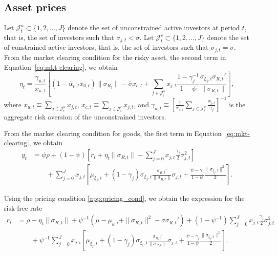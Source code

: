 \subsection{Asset prices}


Let $\mathcal{J}_t^u \subset \{1,2,\ldots, J\}$ denote the set of unconstrained active investors at period $t$, that is, the set of investors such that $\sigma_{j,t} < \overline{\sigma}$. Let $\mathcal{J}_t^c \subset \{1,2,\ldots, J\}$ denote the set of constrained active investors, that is, the set of investors such that $\sigma_{j,t} = \overline{\sigma}$. From the market clearing condition for the risky asset, the second term in Equation~\eqref{eq:mkt-clearing}, we obtain
\begin{equation}
    \eta_{t} =  \frac{\gamma_{u,t}}{x_{u,t}} \left[ (1-\overline{\alpha}_{p,t} x_{0,t})\|\sigma_{R_t}\| - \overline{\sigma} x_{c,t}+ \sum_{j\in \mathcal{J}_t^u} x_{j,t} \frac{1-\gamma_j^{-1}}{1-\psi} \frac{\sigma_{\xi_j,t} \sigma_{R,t}'}{\|\sigma_{R,t}\|}\right],
\end{equation}
where $x_{u,t} \equiv \sum_{j\in \mathcal{J}_t^u} x_{j,t}$, $x_{c,t} \equiv \sum_{j\in \mathcal{J}_t^c} x_{j,t}$, and $\gamma_{u,t} \equiv \left[\frac{1}{x_{u,t}} \sum_{j\in\mathcal{J}_t^u} \frac{x_{j,t}}{\gamma_j}\right]^{-1}$ is the aggregate risk aversion of the unconstrained investors.

From the market clearing condition for goods, the first term in Equation~\eqref{eq:mkt-clearing}, we obtain
\begin{align}
    y_t &= \psi \rho + (1-\psi) \left[ r_t + \eta_t \|\sigma_{R,t}\| - \sum_{j=0}^J x_{j,t}\frac{\gamma_j}{2} \sigma_{j,t}^2 \right] \nonumber\\
    &\qquad +\sum_{j=0}^J x_{j,t} \left[\mu_{\xi_j,t} + (1-\gamma_j)  \sigma_{\xi_j,t} \frac{\sigma_{R,t}'}{\|\sigma_{R,t}\|} \sigma_{j,t} + \frac{\psi - \gamma_j}{1-\psi} \frac{\|\sigma_{\xi_j,t} \|^2}{2}\right].
\end{align}

Using the pricing condition \eqref{app:pricing_cond}, we obtain the expression for the risk-free rate
\begin{align}
     r_t   &  =  \rho - \eta_t \|\sigma_{R,t}\| +\psi^{-1} (\mu - \mu_{y,t}+\|\sigma_{R,t}\|^2- \sigma \sigma_{R,t}')+ \left(1-\psi^{-1}\right)  \sum_{j=0}^J x_{j,t}\frac{\gamma_j}{2} \sigma_{j,t}^2 \nonumber\\
    &\qquad +\psi^{-1}\sum_{j=0}^J x_{j,t} \left[\mu_{\xi_j,t} + (1-\gamma_j)  \sigma_{\xi_j,t} \frac{\sigma_{R,t}'}{\|\sigma_{R,t}\|} \sigma_{j,t} + \frac{\psi - \gamma_j}{1-\psi} \frac{\|\sigma_{\xi_j,t} \|^2}{2}\right].
\end{align}


